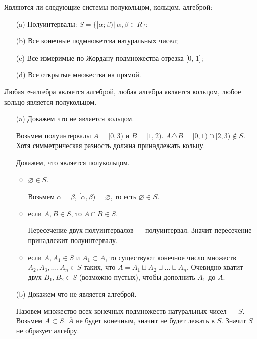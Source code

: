 \begin{task}{5}
Являются ли следующие системы полукольцом, кольцом, алгеброй:
\begin{enumerate}
    \item[(a)]  Полуинтервалы: $S = \{[\alpha; \beta) |~\alpha, \beta \in R\}$;
    \item[(b)] Все конечные подмножетсва натуральных чисел;
    \item[(c)] Все измеримые по Жордану подмножества отрезка [0, 1];
    \item[(d)] Все открытые множества на прямой.
\end{enumerate}
\end{task}
\begin{solution}
Любая $\sigma$-алгебра является алгеброй, любая алгебра является кольцом, любое кольцо является полукольцом.
\begin{enumerate}
    \item[(a)] Докажем что не является кольцом. 
    
    Возьмем полуинтервалы $A=[0,3)$ и $B=[1,2)$. $A \triangle B=[0,1) \cap [2,3) \notin S$. Хотя симметрическая разность должна принадлежать кольцу.
    
    Докажем, что является полукольцом.
    \begin{itemize}
        \item $\varnothing \in S$.
        
        Возьмем $\alpha = \beta$, $[\alpha, \beta) = \varnothing$, то есть $\varnothing \in S$.
        \item если $A, B \in S$, то $A \cap B \in S$.
        
        Пересечение двух полуинтервалов --- полуинтервал. Значит пересечение принадлежит полуинтервалу.
        \item если $A, A_1 \in S$ и $A_1 \subset A$, то существуют конечное число множеств $A_2, A_3,\dots, A_n \in S$ таких, что $A = A_1 \sqcup A_2 \sqcup \dots \sqcup A_n$.
        Очевидно хватит двух $B_1, B_2 \in S$ (возможно пустых), чтобы дополнить $A_1$ до $A$.
    \end{itemize}
    
    \item[(b)] Докажем что не является алгеброй.
    
    Назовем множество всех конечных подмножеств натуральных чисел --- $S$.
    Возьмем $A \subset S$. $\overline{A}$ не будет конечным, значит не будет лежать в  $S$. Значит $S$ не образует алгебру.
    

\end{enumerate}
\end{solution}

